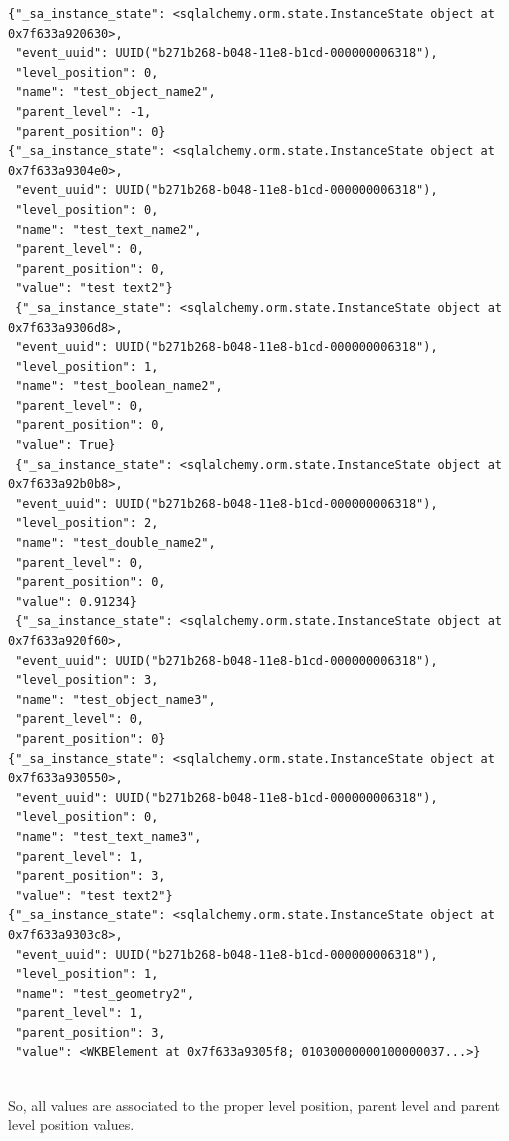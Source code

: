 \begin{lstlisting}[style=python, caption={JSON output after query the eboa for the specific event previously shown.}]
{"_sa_instance_state": <sqlalchemy.orm.state.InstanceState object at 0x7f633a920630>,
 "event_uuid": UUID("b271b268-b048-11e8-b1cd-000000006318"),
 "level_position": 0,
 "name": "test_object_name2",
 "parent_level": -1,
 "parent_position": 0}
{"_sa_instance_state": <sqlalchemy.orm.state.InstanceState object at 0x7f633a9304e0>,
 "event_uuid": UUID("b271b268-b048-11e8-b1cd-000000006318"),
 "level_position": 0,
 "name": "test_text_name2",
 "parent_level": 0,
 "parent_position": 0,
 "value": "test text2"}
 {"_sa_instance_state": <sqlalchemy.orm.state.InstanceState object at 0x7f633a9306d8>,
 "event_uuid": UUID("b271b268-b048-11e8-b1cd-000000006318"),
 "level_position": 1,
 "name": "test_boolean_name2",
 "parent_level": 0,
 "parent_position": 0,
 "value": True}
 {"_sa_instance_state": <sqlalchemy.orm.state.InstanceState object at 0x7f633a92b0b8>,
 "event_uuid": UUID("b271b268-b048-11e8-b1cd-000000006318"),
 "level_position": 2,
 "name": "test_double_name2",
 "parent_level": 0,
 "parent_position": 0,
 "value": 0.91234}
 {"_sa_instance_state": <sqlalchemy.orm.state.InstanceState object at 0x7f633a920f60>,
 "event_uuid": UUID("b271b268-b048-11e8-b1cd-000000006318"),
 "level_position": 3,
 "name": "test_object_name3",
 "parent_level": 0,
 "parent_position": 0}
{"_sa_instance_state": <sqlalchemy.orm.state.InstanceState object at 0x7f633a930550>,
 "event_uuid": UUID("b271b268-b048-11e8-b1cd-000000006318"),
 "level_position": 0,
 "name": "test_text_name3",
 "parent_level": 1,
 "parent_position": 3,
 "value": "test text2"}
{"_sa_instance_state": <sqlalchemy.orm.state.InstanceState object at 0x7f633a9303c8>,
 "event_uuid": UUID("b271b268-b048-11e8-b1cd-000000006318"),
 "level_position": 1,
 "name": "test_geometry2",
 "parent_level": 1,
 "parent_position": 3,
 "value": <WKBElement at 0x7f633a9305f8; 01030000000100000037...>}
 
\end{lstlisting}

So, all values are associated to the proper level position, parent level and parent level position values.

